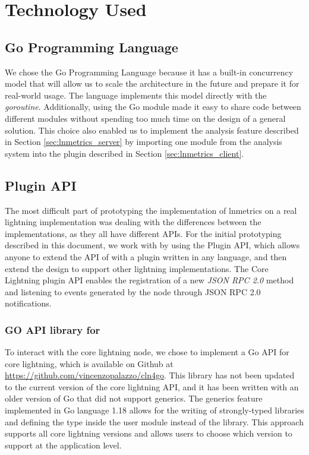 \chapter{Technology Used}\label{chap:tech}

\section{Go Programming Language}

We chose the Go Programming Language because it has a built-in concurrency model that will allow 
us to scale the architecture in the future and prepare it for real-world usage. 
The language implements this model directly with the \emph{goroutine}. Additionally,
using the Go module made it easy to share code between different modules 
without spending too much time on the design of a general solution. 
This choice also enabled us to implement the analysis feature described in Section \ref{sec:lnmetrics_server} 
by importing one module from the analysis system into the plugin described in Section \ref{sec:lnmetrics_client}.

\section{{\CLN} Plugin API}

The most difficult part of prototyping the implementation of lnmetrics on a real 
lightning implementation was dealing with the differences between the implementations, 
as they all have different APIs. For the initial prototyping described in this document,
we work with {\CLN} by using the {\CLN} Plugin API, which allows 
anyone to extend the API of {\CLN} with a plugin written in any language, and then
extend the design to support other lightning implementations.
The Core Lightning plugin API enables the registration 
of a new \emph{JSON RPC 2.0}\cite{jsonrpc} method and listening to 
events generated by the node through JSON RPC 2.0 notifications.

\subsection{GO API library for {\CLN}}

To interact with the core lightning node, we chose to implement a Go API for core 
lightning, which is available on Github at \url{https://github.com/vincenzopalazzo/cln4go}. 
This library has not been updated to the current version of the core lightning 
API, and it has been written with an older version of Go that did not support generics. 
The generics feature implemented in Go language 1.18 allows for the writing of 
strongly-typed libraries and defining the type inside the user module instead of the library. 
This approach supports all core lightning versions and allows users to choose 
which version to support at the application level.

